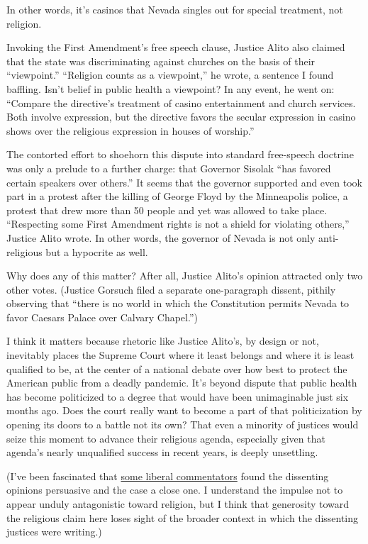 In other words, it's casinos that Nevada singles out for special
treatment, not religion.

Invoking the First Amendment's free speech clause, Justice Alito also
claimed that the state was discriminating against churches on the basis
of their ``viewpoint.'' ``Religion counts as a viewpoint,'' he wrote, a
sentence I found baffling. Isn't belief in public health a viewpoint? In
any event, he went on: ``Compare the directive's treatment of casino
entertainment and church services. Both involve expression, but the
directive favors the secular expression in casino shows over the
religious expression in houses of worship.''

The contorted effort to shoehorn this dispute into standard free-speech
doctrine was only a prelude to a further charge: that Governor Sisolak
``has favored certain speakers over others.'' It seems that the governor
supported and even took part in a protest after the killing of George
Floyd by the Minneapolis police, a protest that drew more than 50 people
and yet was allowed to take place. ``Respecting some First Amendment
rights is not a shield for violating others,'' Justice Alito wrote. In
other words, the governor of Nevada is not only anti-religious but a
hypocrite as well.

Why does any of this matter? After all, Justice Alito's opinion
attracted only two other votes. (Justice Gorsuch filed a separate
one-paragraph dissent, pithily observing that ``there is no world in
which the Constitution permits Nevada to favor Caesars Palace over
Calvary Chapel.'')

I think it matters because rhetoric like Justice Alito's, by design or
not, inevitably places the Supreme Court where it least belongs and
where it is least qualified to be, at the center of a national debate
over how best to protect the American public from a deadly pandemic.
It's beyond dispute that public health has become politicized to a
degree that would have been unimaginable just six months ago. Does the
court really want to become a part of that politicization by opening its
doors to a battle not its own? That even a minority of justices would
seize this moment to advance their religious agenda, especially given
that agenda's nearly unqualified success in recent years, is deeply
unsettling.

(I've been fascinated that
\href{https://www.vox.com/2020/7/25/21338216/supreme-court-churches-pandemic-covid-samuel-alito-brett-kavanaugh-calvary-chapel}{some
liberal commentators} found the dissenting opinions persuasive and the
case a close one. I understand the impulse not to appear unduly
antagonistic toward religion, but I think that generosity toward the
religious claim here loses sight of the broader context in which the
dissenting justices were writing.)

